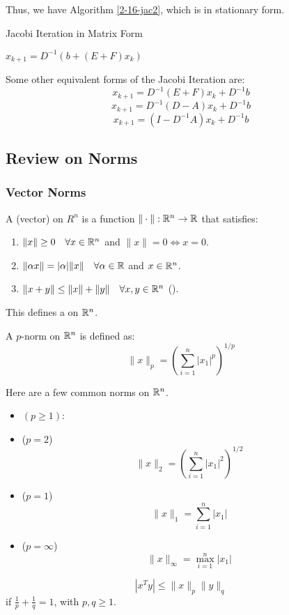 \documentclass[../main/main.tex]{subfiles}
\begin{document}
    Thus, we have Algorithm \ref{2-16-jac2}, which is in stationary form.
        \begin{algorithm}[h!]
	\caption{Jacobi Iteration in Matrix Form}
    \label{2-16-jac2}
	\begin{algorithmic}[1]
      \State $x_{k+1} = D^{-1}(b+(E+F)x_{k})$
      \EndFor
	\end{algorithmic}
	\end{algorithm}
    \begin{remark}
      Some other equivalent forms of the Jacobi Iteration are: \[
x_{k+1} = D^{-1}(E+F)x_{k} + D^{-1} b
\] \[
x_{k+1} = D^{-1}(D-A)x_{k} + D^{-1} b
\] \[
x_{k+1} = (I-D^{-1} A) x_{k} + D^{-1} b
\]
    \end{remark}
\subsection{Review on Norms}
\subsubsection{Vector Norms}
\begin{definition}
  A (vector)  on $R^{n}$ is a function $\|\cdot\| : \mathbb{R}^{n}\to \mathbb{R}$ that satisfies:
  \begin{enumerate}
    \item $\| x\| \geq 0\quad \forall x \in\mathbb{R}^{n}$ and $\|x\|= 0 \iff x = 0$.
    \item $\|\alpha x\|= |\alpha| \|x\| \quad \forall \alpha \in\mathbb{R}$ and $x \in\mathbb{R}^{n}$.
          \item $\|x+y\| \leq \|x\|+ \|y\| \quad \forall x,y \in\mathbb{R}^{n}$ ().
  \end{enumerate}
  This defines a  on $\mathbb{R}^{n}$.
\end{definition}
\begin{definition}
  A $p$-norm on $\mathbb{R}^{n}$ is defined as: \[
          \|x\|_{p} = \left(\sum_{i=1}^n|x_{1}|^{p}\right)^{1 / p}
  \]
\end{definition}

\begin{example}
  Here are a few common norms on $\mathbb{R}^{n}$.
  \begin{itemize}
    \item {} $(p\geq1)$: \[
          \]
    \item {} ($p=2$) \[
          \|x\|_{2} = \left(\sum_{i=1}^n|x_{1}|^{2}\right)^{1 / 2}
          \]
    \item {} ($p=1$) \[
          \|x\|_{1} = \sum_{i=1}^n|x_{1}|
          \]
    \item {} ($p=\infty$) \[
          \|x\|_{\infty} = \max_{i=1}^n|x_{1}|
          \]
  \end{itemize}
\end{example}
\begin{theorem} \[
|x^{T} y| \leq \|x\|_{p} \|y\|_{q}
  \] if $\frac{1}{p} + \frac{1}{q} = 1$, with $p,q \geq 1$.
\end{theorem}
\end{document}
